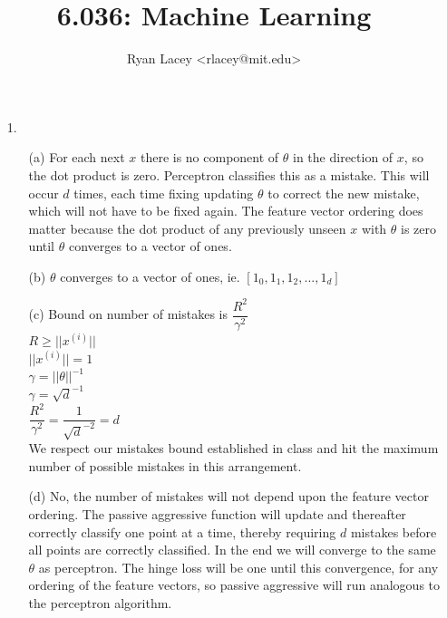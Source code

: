 \documentclass{article}
\begin{document}

\title{6.036: Machine Learning}
\author{
  Ryan Lacey <rlacey@mit.edu>\\
}
        
\maketitle
        

\begin{enumerate}
\item[1.] 
	\begin{enumerate}
	\item[(a)]
		For each next $x$ there is no component of $\theta$ in the direction of $x$, so the dot product is zero. Perceptron classifies this as a mistake. This will occur $d$ times, each time fixing updating $\theta$ to correct the new mistake, which will not have to be fixed again. The feature vector ordering does matter because the dot product of any previously unseen $x$ with $\theta$ is zero until $\theta$ converges to a vector of ones.
\bigskip
	\item[(b)]
		$\theta$ converges to a vector of ones, ie. $\left[1_0, 1_1, 1_2, ..., 1_d\right]$
\bigskip
	\item[(c)]
		Bound on number of mistakes is $\dfrac{R^2}{\gamma^2}$\\
		
		$R \ge ||x^{(i)}||$\\
		$||x^{(i)}|| = 1$\\
		
		$\gamma = ||\theta||^{-1}$\\
		$\gamma = \sqrt{d}^{-1}$\\
		
		$\dfrac{R^2}{\gamma^2} = \dfrac{1}{\sqrt{d}^{-2}} = d$\\
		
		We respect our mistakes bound established in class and hit the maximum number of possible mistakes in this arrangement.
\bigskip
	\item[(d)]
		No, the number of mistakes will not depend upon the feature vector ordering. The passive aggressive function will update and thereafter correctly classify one point at a time, thereby requiring $d$ mistakes before all points are correctly classified. In the end we will converge to the same $\theta$ as perceptron. The hinge loss will be one until this convergence, for any ordering of the feature vectors, so passive aggressive will run analogous to the perceptron algorithm.
		

\end{enumerate}
\end{enumerate}
\end{document}
